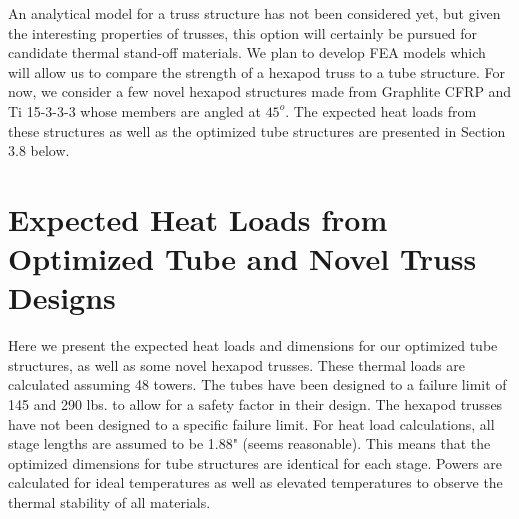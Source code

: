 \documentclass{report}
\begin{document}
An analytical model for a truss structure has not been considered yet, but given the interesting properties of trusses, this option will certainly be pursued for candidate thermal stand-off materials. We plan to develop FEA models which will allow us to compare the strength of a hexapod truss to a tube structure. For now, we consider a few novel hexapod structures made from Graphlite CFRP and Ti 15-3-3-3 whose members are angled at $45^{o}$. The expected heat loads from these structures as well as the optimized tube structures are presented in Section 3.8 below.

\section{Expected Heat Loads from Optimized Tube and Novel Truss Designs}

Here we present the expected heat loads and dimensions for our optimized tube structures, as well as some novel hexapod trusses. These thermal loads are calculated assuming 48 towers. The tubes have been designed to a failure limit of 145 and 290 lbs. to allow for a safety factor in their design. The hexapod trusses have not been designed to a specific failure limit. For heat load calculations, all stage lengths are assumed to be 1.88" (seems reasonable). This means that the optimized dimensions for tube structures are identical for each stage. Powers are calculated for ideal temperatures as well as elevated temperatures to observe the thermal stability of all materials.
\end{document}
